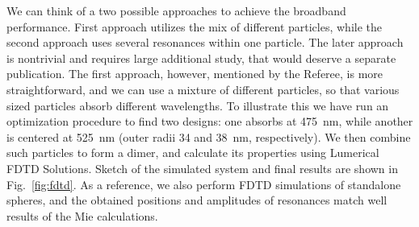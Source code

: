\documentclass[a4paper]{article}
\begin{document}
We can think of a two possible approaches to achieve the broadband performance. First approach utilizes the mix of different particles, while the second approach uses several resonances within one particle. The later approach is nontrivial and requires large additional study, that would deserve a separate publication. The first approach, however, mentioned by the Referee, is more straightforward, and we can use a mixture of different particles, so that various sized particles absorb different wavelengths.  To illustrate this we have run an optimization procedure to find two designs: one absorbs at 475~nm, while another is centered at 525~nm (outer radii 34 and 38~nm, respectively). We then combine such particles to form a dimer, and calculate its properties using Lumerical FDTD Solutions. Sketch of the simulated system and final results are shown in Fig.~\ref{fig:fdtd}. As a reference, we also perform FDTD simulations of standalone spheres, and the obtained positions and amplitudes of resonances match well results of the Mie calculations.
\end{document}
